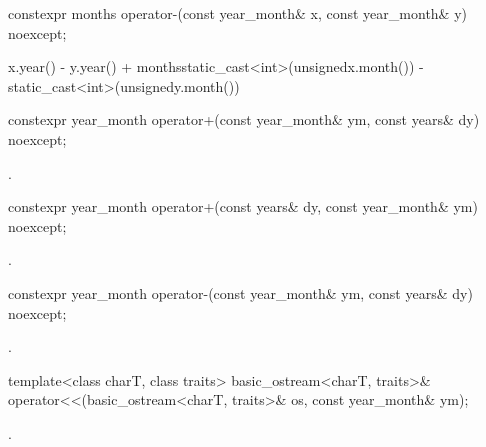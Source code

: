 %
\begin{itemdecl}
constexpr months operator-(const year_month& x, const year_month& y) noexcept;
\end{itemdecl}

\begin{itemdescr}
\pnum
\returns
\begin{codeblock}
x.year() - y.year() + months{static_cast<int>(unsigned{x.month()}) -
                             static_cast<int>(unsigned{y.month()})}
\end{codeblock}
\end{itemdescr}

%
\begin{itemdecl}
constexpr year_month operator+(const year_month& ym, const years& dy) noexcept;
\end{itemdecl}

\begin{itemdescr}
\pnum
\returns {}.
\end{itemdescr}

%
\begin{itemdecl}
constexpr year_month operator+(const years& dy, const year_month& ym) noexcept;
\end{itemdecl}

\begin{itemdescr}
\pnum
\returns {}.
\end{itemdescr}

%
\begin{itemdecl}
constexpr year_month operator-(const year_month& ym, const years& dy) noexcept;
\end{itemdecl}

\begin{itemdescr}
\pnum
\returns {}.
\end{itemdescr}

%
\begin{itemdecl}
template<class charT, class traits>
  basic_ostream<charT, traits>&
    operator<<(basic_ostream<charT, traits>& os, const year_month& ym);
\end{itemdecl}

\begin{itemdescr}
\pnum
\returns {}.
\end{itemdescr}

